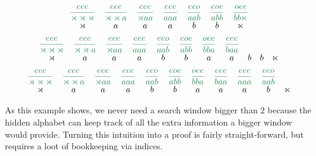 \begin{examplebox}
\[\begin{array}{ccccccc}
                \ComplexState{eee}{\LeftEdge \LeftEdge \LeftEdge} &
                \ComplexState{eee}{\LeftEdge \LeftEdge a} &
                \ComplexState{eee}{\LeftEdge a a} &
                \ComplexState{eee}{a a a} &
                \ComplexState{eeo}{a a b} &
                \ComplexState{eoe}{a b b} &
                \ComplexState{oee}{b b \RightEdge}
                \\
                \LeftEdge & a & a & a & b & b & \RightEdge 
        \end{array}
    \]
    \[ 
        \begin{array}{ccccccccccc}
                \ComplexState{eee}{\LeftEdge \LeftEdge \LeftEdge} &
                \ComplexState{eee}{\LeftEdge \LeftEdge a} &
                \ComplexState{eee}{\LeftEdge a a} &
                \ComplexState{eee}{a a a} &
                \ComplexState{eeo}{a a b} &
                \ComplexState{eoe}{a b b} &
                \ComplexState{oee}{b b a} &
                \ComplexState{eee}{b a a} &
                \\
                \LeftEdge & a & a & a & b & b & a & a & b & b &\RightEdge
        \end{array}
    \]
    \[ 
        \begin{array}{ccccccccccc}
                \ComplexState{eee}{\LeftEdge \LeftEdge \LeftEdge} &
                \ComplexState{eee}{\LeftEdge \LeftEdge a} &
                \ComplexState{eee}{\LeftEdge a a} &
                \ComplexState{eee}{a a a} &
                \ComplexState{eeo}{a a b} &
                \ComplexState{eoe}{a b b} &
                \ComplexState{oee}{b b a} &
                \ComplexState{eee}{b a a} &
                \ComplexState{eee}{a a a} &
                \ComplexState{eeo}{a a b} &
                \\
                \LeftEdge & a & a & a & b & b & a & a & a & b &\RightEdge
        \end{array}
    \]
\end{examplebox}
%
As this example shows, we never need a search window bigger than $2$ because the hidden alphabet can keep track of all the extra information a bigger window would provide.
Turning this intuition into a proof is fairly straight-forward, but requires a loot of bookkeeping via indices.
%
